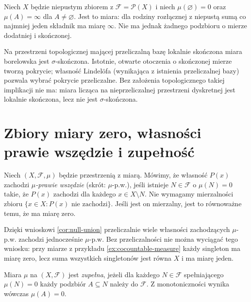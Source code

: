 \begin{przyklad}
Niech $X$ będzie niepustym zbiorem z $\mathcal F=\mathcal P(X)$
i niech $\mu(\varnothing)=0$ oraz $\mu(A)=\infty$
dla $A\ne\varnothing$. Jest to miara: dla rodziny
rozłącznej z niepustą sumą co najmniej jeden składnik
ma miarę $\infty$. Nie ma jednak żadnego podzbioru
o mierze dodatniej i skończonej.
\end{przyklad}

\begin{uwaga}
Na przestrzeni topologicznej mającej przeliczalną bazę
lokalnie skończona miara borelowska jest $\sigma$-skończona.
Istotnie, otwarte otoczenia o skończonej mierze tworzą
pokrycie; własność Lindelöfa (wynikająca z istnienia
przeliczalnej bazy) pozwala wybrać pokrycie przeliczalne.
Bez założenia topologicznego takiej implikacji nie ma:
miara licząca na nieprzeliczalnej przestrzeni dyskretnej
jest lokalnie skończona, lecz nie jest $\sigma$-skończona.
\end{uwaga}

\section{Zbiory miary zero, własności prawie wszędzie i zupełność}

\begin{definicja}
\label{def:almost-everywhere}
Niech $(X,\mathcal F,\mu)$ będzie przestrzenią z miarą.
Mówimy, że własność $P(x)$ zachodzi \emph{$\mu$-prawie wszędzie}
(skrót: $\mu$-p.w.), jeśli istnieje $N\in\mathcal F$
o $\mu(N)=0$ takie, że $P(x)$ zachodzi dla każdego
$x\in X\setminus N$. Nie wymagamy mierzalności zbioru
$\{x\in X:P(x)\text{ nie zachodzi}\}$.
Jeśli jest on mierzalny, jest to równoważne temu,
że ma miarę zero.
\end{definicja}

\begin{uwaga}
Dzięki wnioskowi \ref{cor:null-union} przeliczalnie wiele
własności zachodzących $\mu$-p.w. zachodzi jednocześnie
$\mu$-p.w. Bez przeliczalności nie można wyciągać tego
wniosku: przy miarze z przykładu \ref{ex:cocountable-measure}
każdy singleton ma miarę zero, lecz suma wszystkich singletonów
jest równa $X$ i ma miarę jeden.
\end{uwaga}

\begin{definicja}
\label{def:complete-measure}
Miara $\mu$ na $(X,\mathcal F)$ jest \emph{zupełna}, jeżeli
dla każdego $N\in\mathcal F$ spełniającego $\mu(N)=0$
każdy podzbiór $A\subseteq N$ należy do $\mathcal F$.
Z monotoniczności wynika wówczas $\mu(A)=0$.
\end{definicja}

